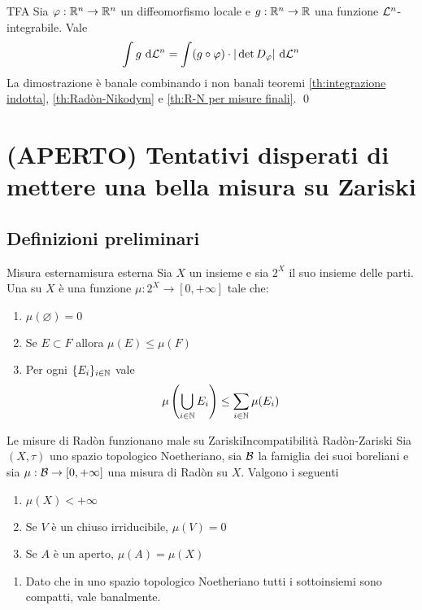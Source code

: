 \documentclass[openany]{book}
\begin{document}
\begin{theorem}{TFA}{}
    Sia $\varphi : \mathbb{R}^n \to \mathbb{R}^n$ un diffeomorfismo locale e $g : \mathbb{R}^n \to \mathbb{R}$ una funzione $\mathcal{L}^n$-integrabile. Vale
    \[\intop g \de \L^n = \int (g \circ \varphi)\cdot |\det D_\varphi|\de \L^n\]
    \proof
    La dimostrazione è banale combinando i non banali teoremi \ref{th:integrazione indotta}, \ref{th:Radòn-Nikodym} e \ref{th:R-N per misure finali}.
    \qed
\end{theorem}

\chapter{(APERTO) Tentativi disperati di mettere una bella misura su Zariski}
\renewcommand\A{\mathbb{A}}

\section{Definizioni preliminari}

\begin{definition}{Misura esterna}{misura esterna}
    Sia $X$ un insieme e sia $2^X$ il suo insieme delle parti. Una  su $X$ è una funzione $\mu : 2^X\to [0,+\infty]$ tale che:\begin{enumerate}
        \item $\mu(\varnothing) = 0$
        \item Se $E \subset F$ allora $\mu(E)\le \mu(F)$
        \item Per ogni $\{E_i\}_{i \in \mathbb{N}}$ vale
        \[ \mu\left( \bigcup_{i \in \mathbb{N}} E_i \right) \le \sum_{i \in \mathbb{N}} \mu(E_i) \]
    \end{enumerate}
\end{definition}

\begin{theorem}{Le misure di Radòn funzionano male su Zariski}{Incompatibilità Radòn-Zariski}
    Sia $(X,\tau)$ uno spazio topologico Noetheriano, sia $\mathcal{B}$ la famiglia dei suoi boreliani e sia $\mu : \mathcal{B} \to [0,+\infty]$ una misura di Radòn su $X$. Valgono i seguenti
    \begin{enumerate}
        \item $\mu(X) < +\infty$
        \item Se $V$ è un chiuso irriducibile, $\mu(V) = 0$
        \item Se $A$ è un aperto, $\mu(A) = \mu(X)$
    \end{enumerate}
    \proof 
    \begin{enumerate}
        \item Dato che in uno spazio topologico Noetheriano tutti i sottoinsiemi sono compatti, vale banalmente.
    \end{enumerate}
\end{theorem}
\end{document}
